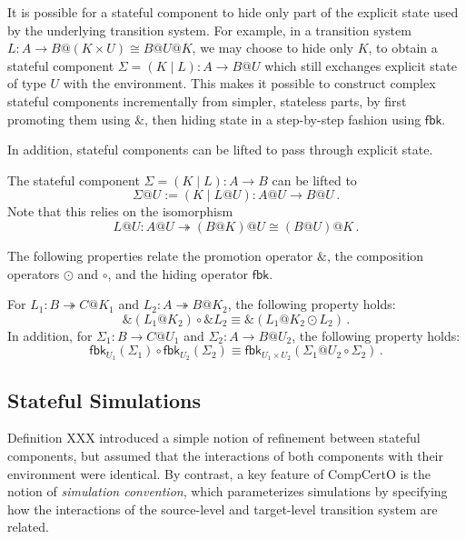 \documentclass[acmsmall,screen,review,anonymous]{acmart}
\newcommand{\kw}[1]{\ensuremath{ \mathsf{#1} }}
\begin{document}
It is possible for a stateful component
to hide only part of the explicit state
used by the underlying transition system.
For example,
in a transition system
$L : A \rightarrow B@(K \times U) \cong B@U@K$,
we may choose to hide only $K$,
to obtain a stateful component
$\Sigma = (K \mid L) : A \rightarrow B@U$
which still exchanges explicit state of type $U$
with the environment.
This makes it possible to construct
complex stateful components incrementally
from simpler, stateless parts,
by first promoting them using $\&$,
then hiding state in a step-by-step fashion
using $\kw{fbk}$.

In addition,
stateful components can be lifted
to pass through explicit state.

\begin{definition} \label{def:slift}
The stateful component $\Sigma = (K \mid L) : A \rightarrow B$
can be lifted to \[ \Sigma@U := (K \mid L@U) : A@U \rightarrow B@U \,. \]
Note that this relies on the isomorphism
\[
  L@U : A@U \twoheadrightarrow (B@K)@U \cong (B@U)@K
  \,.
\]
\end{definition}

The following properties
relate the promotion operator $\&$,
the composition operators $\odot$ and $\circ$,
and the hiding operator $\kw{fbk}$.

\begin{lemma}
  For $L_1 : B \twoheadrightarrow C@K_1$ and
  $L_2 : A \twoheadrightarrow B@K_2$,
  the following property holds:
  \[
    \&(L_1@K_2) \circ \&L_2 \equiv \&(L_1@K_2 \odot L_2)
    \,.
  \]
  In addition, for $\Sigma_1 : B \rightarrow C@U_1$
  and $\Sigma_2 : A \rightarrow B@U_2$,
  the following property holds:
  \[
    \kw{fbk}_{U_1}(\Sigma_1) \circ \kw{fbk}_{U_2}(\Sigma_2) \equiv
    \kw{fbk}_{U_1 \times U_2}(\Sigma_1@U_2 \circ \Sigma_2)
    \,.
  \]
\end{lemma}


\subsection{Stateful Simulations} %

Definition XXX introduced a simple notion of refinement
between stateful components,
but assumed that the interactions of both components
with their environment were identical.
By contrast, a key feature of CompCertO
is the notion of \emph{simulation convention},
which parameterizes simulations by
specifying how the interactions of
the source-level and target-level transition system
are related.
\end{document}
